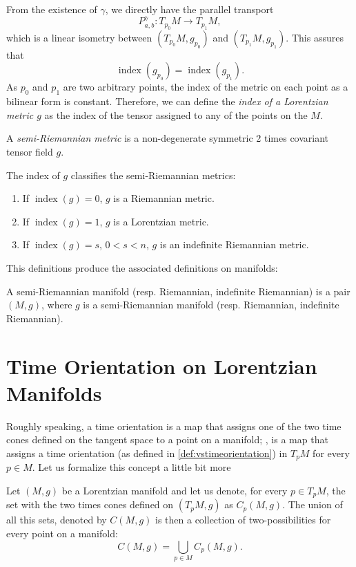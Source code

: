 From the existence of $\gamma$, we directly have the parallel transport
\[
	P^\gamma_{a,b} \colon T_{p_0}M \to T_{p_1}M,
\]
which is a linear isometry between $(T_{p_0}M, g_{p_0})$ and $(T_{p_1}M, g_{p_1})$. This assures that
\[
	\operatorname{index}(g_{p_0}) = \operatorname{index}(g_{p_1}).
\]
As $p_0$ and $p_1$ are two arbitrary points, the index of the metric on each point as a bilinear form is constant. Therefore, we can define the \emph{index of a Lorentzian metric $g$} as the index of the tensor assigned to any of the points on the $M$.

\begin{definition}
	A \emph{semi-Riemannian metric} is a non-degenerate symmetric 2 times covariant tensor field $g$.
\end{definition}

The index of $g$ classifies the semi-Riemannian metrics:
\begin{enumerate}
	\item If $\operatorname{index}(g) = 0$, $g$ is a Riemannian metric.
	\item If $\operatorname{index}(g) = 1$, $g$ is a Lorentzian metric.
	\item If $\operatorname{index}(g) = s$, $0 < s < n$, $g$ is an indefinite Riemannian metric.
\end{enumerate}

This definitions produce the associated definitions on manifolds:
\begin{definition}
	A semi-Riemannian manifold (resp. Riemannian, indefinite Riemannian) is a pair $(M,g)$, where $g$ is a semi-Riemannian manifold (resp. Riemannian, indefinite Riemannian).
\end{definition}

\section{Time Orientation on Lorentzian Manifolds}

Roughly speaking, a time orientation is a map that assigns one of the two time cones defined on the tangent space to a point on a manifold; \ie, is a map that assigns a time orientation (as defined in \autoref{def:vstimeorientation}) in $T_pM$ for every $p \in M$. Let us formalize this concept a little bit more

Let $(M,g)$ be a Lorentzian manifold and let us denote, for every $p \in T_pM$, the set with the two times cones defined on $(T_p M, g)$ as $C_p(M,g)$. The union of all this sets, denoted by $C(M,g)$ is then a collection of two-possibilities for every point on a manifold:
\[
	C(M,g) = \bigcup_{p \in M} C_p(M,g).
\]

